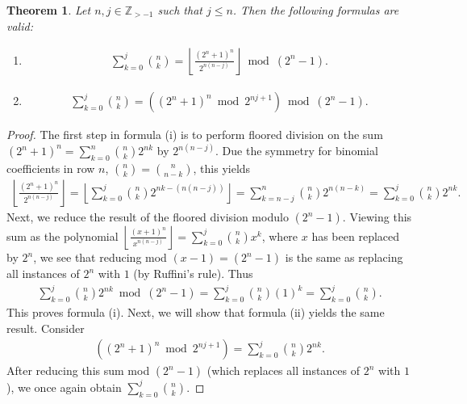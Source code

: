 \documentclass[10pt,a4paper]{article}
\theoremstyle{plain}
\newtheorem{theorem}{Theorem}[section]
\newcommand{\floor}[1]{\left\lfloor #1 \right\rfloor}
\newcommand{\Z}{\mathbb{Z}}
\begin{document}
\begin{theorem} \label{proof:binomialcoeffpartialsums}
Let $n,j \in \Z_{>-1}$ such that $j \leq n$. Then the following formulas are valid:
\begin{enumerate}
\item[(i)]
    \begin{align*}
    \sum_{k=0}^{j} \binom{n}{k}
    = \floor{\frac{(2^n+1)^n}{2^{n(n-j)}}} \bmod (2^n-1) .
    \end{align*}
\item[(ii)]
    \begin{align*}
    \sum_{k=0}^{j} \binom{n}{k}
    = \left( (2^n+1)^n \bmod 2^{nj+1} \right) \bmod (2^n-1) .
    \end{align*}
\end{enumerate}
\end{theorem}
\begin{proof}
The first step in formula (i) is to perform floored division on the sum $(2^n+1)^n = \sum_{k=0}^n \binom{n}{k} 2^{nk}$ by $2^{n(n-j)}$. Due the symmetry for binomial coefficients in row $n$, $\binom{n}{k} = \binom{n}{n-k}$, this yields
\begin{align*}
    \floor{\frac{(2^n+1)^n}{2^{n(n-j)}}}
    = \floor{ \sum_{k=0}^{j} \binom{n}{k} 2^{nk-(n(n-j))} }
    = \sum_{k=n-j}^{n} \binom{n}{k} 2^{n(n-k)}
    = \sum_{k=0}^{j} \binom{n}{k} 2^{nk} .
\end{align*}
Next, we reduce the result of the floored division modulo $(2^n-1)$. Viewing this sum as the polynomial $\floor{\frac{(x+1)^n}{x^{n(n-j)}}} = \sum_{k=0}^{j} \binom{n}{k} x^k$, where $x$ has been replaced by $2^n$, we see that reducing mod $(x-1) = (2^n-1)$ is the same as replacing all instances of $2^n$ with $1$ (by Ruffini's rule). Thus
\begin{align*}
    \sum_{k=0}^{j} \binom{n}{k} 2^{nk} \bmod (2^n-1)
    = \sum_{k=0}^{j} \binom{n}{k} (1)^k
    = \sum_{k=0}^{j} \binom{n}{k} .
\end{align*}
This proves formula (i). Next, we will show that formula (ii) yields the same result. Consider
\begin{align*}
    \left( (2^n+1)^n \bmod 2^{nj+1} \right)
    = \sum_{k=0}^{j} \binom{n}{k} 2^{nk} .
\end{align*}
After reducing this sum mod $(2^n-1)$ (which replaces all instances of $2^n$ with $1$), we once again obtain $\sum_{k=0}^{j} \binom{n}{k}$.
\end{proof}
\end{document}
